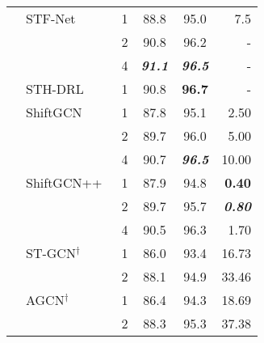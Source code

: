 \documentclass[journal]{IEEEtran}
\newcommand\paretocolor{lgreen!20}
\theoremstyle{definition}
\begin{document}
\begin{table}[!btp]
\begin{center}
{\begin{tabular}{llcccr}
    & {STF-Net}~\cite{wu2023spatiotemporal}      & {1}             & {88.8}  & {95.0}    & {7.5} \\
    &                                               & {2}             & {90.8}  & {96.2}    & {-} \\
    &                                               & {4}             & \textbf{\textit{{91.1}}}  & \textbf{\textit{{96.5}}}    & - \\

    & {STH-DRL}~\cite{nikpour2023spatio}         & {1}        & {90.8}  & \textbf{{96.7}}    & {-} \\
    

    

    
    & ShiftGCN~\cite{cheng2020skeleton}             & 1             & 87.8  & 95.1    & 2.50 \\ 
    &                                               & 2             & 89.7  & 96.0    & 5.00 \\ 
    &                                               & 4             & \colorbox{\paretocolor}{90.7}  & \colorbox{\paretocolor}{\textbf{\textit{96.5}}}    & \colorbox{\paretocolor}{10.00} \\ 
    & ShiftGCN++~\cite{cheng2021extremely}          & 1             & \colorbox{\paretocolor}{87.9}  & \colorbox{\paretocolor}{94.8}    & \colorbox{\paretocolor}{\textbf{0.40}} \\ 
    &                                               & 2             & \colorbox{\paretocolor}{89.7}  &  \colorbox{\paretocolor}{95.7}    & \colorbox{\paretocolor}{\textbf{\textit{0.80}}} \\ 
    &                                               & 4             &  \colorbox{\paretocolor}{90.5}  & \colorbox{\paretocolor}{96.3}    & \colorbox{\paretocolor}{1.70} \\ 
    \addlinespace[0.5ex] \cline{2-6} \addlinespace[0.5ex]
    
    & ST-GCN$^\dagger$                              & 1             & 86.0  & 93.4    & 16.73 \\
    &                                               & 2             & 88.1  & 94.9    & 33.46 \\
  
    & AGCN$^\dagger$                                & 1             & 86.4  & 94.3    & 18.69 \\
    &                                               & 2             & 88.3  & 95.3    & 37.38 \\
  

\end{tabular}}
\end{center}
\end{table}
\end{document}
